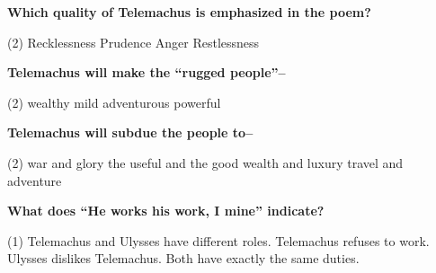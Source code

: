 \documentclass[12pt,a4paper]{exam}
\begin{document}
\begin{questions}
	\begin{minipage}{\textwidth}
		\question \textbf{Which quality of Telemachus is emphasized in the poem?}

		\begin{tasks}(2)
			\task Recklessness
			\task Prudence
			\task Anger
			\task Restlessness
		\end{tasks}
	\end{minipage}


	\begin{minipage}{\textwidth}
		\question \textbf{Telemachus will make the ``rugged people''--}

		\begin{tasks}(2)
			\task wealthy
			\task mild
			\task adventurous
			\task powerful
		\end{tasks}
	\end{minipage}


	\begin{minipage}{\textwidth}
		\question \textbf{Telemachus will subdue the people to--}

		\begin{tasks}(2)
			\task war and glory
			\task the useful and the good
			\task wealth and luxury
			\task travel and adventure
		\end{tasks}
	\end{minipage}


	\begin{minipage}{\textwidth}
		\question \textbf{What does ``He works his work, I mine'' indicate?}

		\begin{tasks}(1)
			\task Telemachus and Ulysses have different roles.
			\task Telemachus refuses to work.
			\task Ulysses dislikes Telemachus.
			\task Both have exactly the same duties.
		\end{tasks}
	\end{minipage}



\end{questions}
\end{document}
